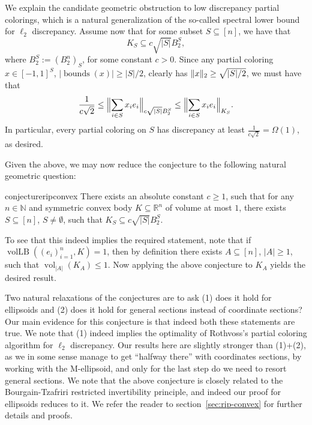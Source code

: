 \documentclass[11pt]{article}
\newcommand{\R}{{\mathbb{R}}}
\newcommand{\N}{{\mathbb{N}}}
\DeclareMathOperator{\vollb}{volLB}
\DeclareMathOperator{\vol}{vol}
\DeclareMathOperator{\bnds}{bounds}
\DeclarePairedDelimiter\norm{\lVert}{\rVert}
\begin{document}
We explain the candidate geometric obstruction to low discrepancy partial
colorings, which is a natural generalization of the so-called spectral lower
bound for $\ell_2$ discrepancy. Assume now that for some subset $S \subseteq
[n]$, we have that 
\begin{equation}
\label{eq:spec-obst-intro}
K_S \subseteq c \sqrt{|S|} B_2^S,
\end{equation}
where $B_2^S := (B_2^n)_S$, for some constant $c > 0$. Since any partial
coloring $x \in [-1,1]^S$, $|\bnds(x)|\geq |S|/2$, clearly has $\norm{x}_2 \geq
\sqrt{|S|/2}$, we must have that
\begin{equation}
\label{eq:spec-lb-intro}
\frac{1}{c\sqrt{2}} 
\leq \Bigl\|\sum_{i \in S} x_i e_i\Bigr\|_{c\sqrt{|S|}B_2^S} 
\leq \Bigl\|\sum_{i \in S} x_i e_i\Bigr\|_{K_S}.
\end{equation}
In particular, every partial coloring on $S$ has discrepancy at least $\tfrac{1}{c
\sqrt{2}} = \Omega(1)$, as desired.

Given the above, we may now reduce the conjecture to the following natural
geometric question:

\begin{restatable}{conjecture}{ripconvex} 
\label{conj:rip-convex-bodies}
There exists an absolute constant $c \geq 1$, such that for any $n \in \N$
and symmetric convex body $K \subseteq \R^n$ of volume at most $1$, there exists $S
\subseteq [n]$, $S \neq \emptyset$, such that $K_S \subseteq c\sqrt{|S|}B_2^S$. 
\end{restatable}

To see that this indeed implies the required statement, note that if
$\vollb((e_i)_{i=1}^n,K) = 1$, then by definition there exists $A \subseteq
[n]$, $|A| \geq 1$, such that $\vol_{|A|}(K_A) \leq 1$. Now applying the above
conjecture to $K_A$ yields the desired result. 

Two natural relaxations of the conjectures are to ask (1) does it hold for
ellipsoids and (2) does it hold for general sections instead of coordinate
sections? Our main evidence for this conjecture is that indeed both these
statements are true. We note that (1) indeed implies the optimality of
Rothvoss's partial coloring algorithm for $\ell_2$ discrepancy. Our results here
are slightly stronger than (1)+(2), as we in some sense manage to get ``halfway
there'' with coordinates sections, by working with the M-ellipsoid, and only for
the last step do we need to resort general sections. We note that the above
conjecture is closely related to the Bourgain-Tzafriri restricted invertibility
principle, and indeed our proof for ellipsoids reduces to it. We refer the
reader to section~\ref{sec:rip-convex} for further details and proofs.
\end{document}
